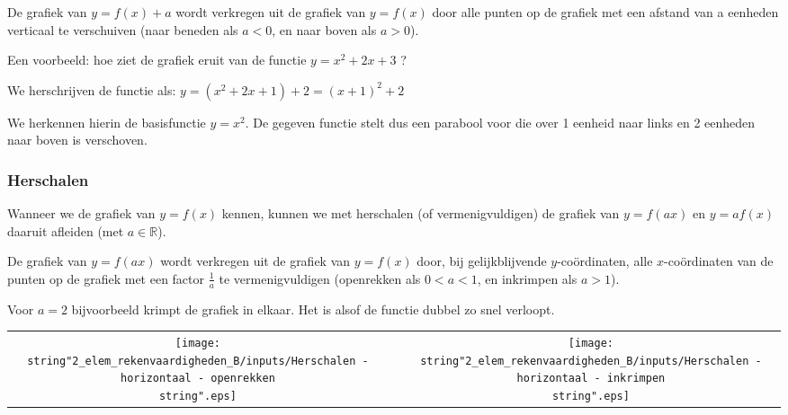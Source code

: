 \medskip{}


\noindent De grafiek van $y=f(x)+a$ wordt verkregen uit de grafiek
van $y=f(x)$ door alle punten op de grafiek met een afstand van a
eenheden verticaal te verschuiven (naar beneden als $a<0$, en naar
boven als $a>0$).

\noindent \medskip{}




Een voorbeeld: hoe ziet de grafiek eruit van de functie $y=x^{2}+2x+3$
?

We herschrijven de functie als: $y=\left(x^{2}+2x+1\right)+2=\left(x+1\right)^{2}+2$

We herkennen hierin de basisfunctie $y=x^{2}$. De gegeven functie
stelt dus een parabool voor die over 1 eenheid naar links en 2 eenheden
naar boven is verschoven.


\subsubsection{Herschalen}

\noindent Wanneer we de grafiek van $y=f(x)$ kennen, kunnen we met
herschalen (of vermenigvuldigen) de grafiek van $y=f(ax)$ en $y=af(x)$
daaruit afleiden (met $a\in\mathbb{R}$).

\medskip{}


\noindent De grafiek van $y=f(ax)$ wordt verkregen uit de grafiek
van $y=f(x)$ door, bij gelijkblijvende $y$-co\"ordinaten, alle $x$-co\"ordinaten
van de punten op de grafiek met een factor $\frac{1}{a}$ te vermenigvuldigen
(openrekken als $0<a<1$, en inkrimpen als $a>1$).

\noindent Voor $a=2$ bijvoorbeeld krimpt de grafiek in elkaar. Het
is alsof de functie dubbel zo snel verloopt.

\noindent \medskip{}


\begin{tabular}{ccc}
\texttt{[image: \\string"2\_elem\_rekenvaardigheden\_B/inputs/Herschalen - horizontaal - openrekken\\string".eps]}  &  & \texttt{[image: \\string"2\_elem\_rekenvaardigheden\_B/inputs/Herschalen - horizontaal - inkrimpen\\string".eps]} \tabularnewline
\end{tabular}

